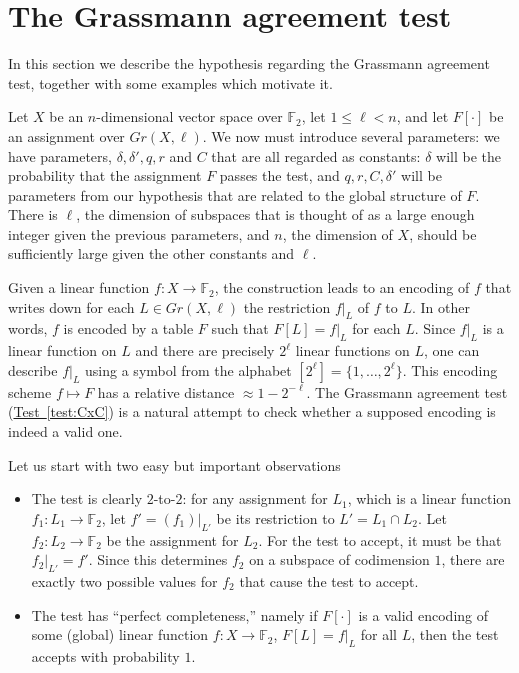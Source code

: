 \documentclass[11pt]{article}
\numberwithin{equation}{section}
\theoremstyle{definition}
\theoremstyle{plain}
\newcommand{\expref}[2]{\hyperref[#2]{#1~\ref{#2}}}
\renewcommand\le{\leqslant}
\def\F{\mathbb{F}}
\begin{document}
\section{The Grassmann agreement test}\label{section:grassmann}


In this section we describe the hypothesis regarding the Grassmann
agreement test, together with some examples which motivate it.

Let $X$ be an $n$-dimensional vector space over $\F_2$, let
$1\le \ell<n$, and let $F[\cdot]$ be an assignment over
$Gr(X,\ell)$. We now must introduce several parameters: we
have parameters, $\delta, \delta', q, r$ and $C$ that are all regarded
as constants: $\delta$ will be the probability that the assignment $F$ passes
the test, and $q,r,C,\delta'$ will be parameters from our hypothesis that are related to
the global structure of $F$. There is $\ell$, the dimension of subspaces that is thought of as a large enough integer given
the previous parameters, and $n$, the dimension of $X$, should be
sufficiently large given the other constants and $\ell$.


Given a linear function $f:X\to \F_2$, the construction leads to an
encoding of $f$ that writes down for each $L\in Gr(X,\ell)$ the
restriction $f|_L$ of $f$ to $L$. In other words, $f$ is encoded by a
table $F$ such that $F[L] = f|_L$ for each $L$. Since $f|_L$ is a
linear function on $L$ and there are precisely $2^\ell$ linear
functions on $L$, one can describe $f|_L$ using a symbol from the
alphabet $[2^\ell] = \{1,\ldots, 2^\ell\}$. This encoding scheme
$f \mapsto F$ has a relative distance $\approx 1-2^{-\ell}$. The
Grassmann agreement test (\expref{Test}{test:CxC}) is a natural attempt
to check whether a supposed encoding is indeed a valid one.

\medskip \noindent
Let us start with two easy but important observations
\begin{itemize}
%
\item The test is clearly $2$-to-$2$: for any assignment for $L_1$,
  which is a linear function $f_1:L_1\to\F_2$, let $f'= (f_1)|_{L'}$ be its restriction to $L'=L_1 \cap L_2$. Let $f_2:L_2\to\F_2$ be the assignment for $L_2$. For the test to accept, it must be that $f_2|_{L'} = f'$. Since this determines $f_2$ on a subspace of codimension $1$, there are exactly two possible values for $f_2$ that cause the test to accept.
%
\item The test has ``perfect completeness,'' namely
if $F[\cdot]$ is a valid encoding of some (global) linear function $f:X \to\F_2$, $F[L]= f|_L$ for all $L$, then
the test accepts with probability $1$.
%
\end{itemize}
\end{document}
